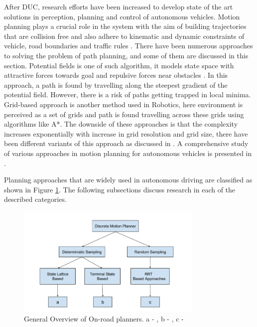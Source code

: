 After DUC, research efforts have been increased to develop state of the art solutions in perception, planning and control of autonomous vehicles. Motion planning plays a crucial role in the system with the aim of building trajectories that are collision free and also adhere to kinematic and dynamic constraints of vehicle, road boundaries and traffic rules \cite{motion_planning_techniques}. There have been numerous approaches to solving the problem of path planning, and some of them are discussed in this section. Potential fields is one of such algorithm, it models state space with attractive forces towards goal and repulsive forces near obstacles \cite{potential_field_3} \cite{potential_field_1} \cite{potential_field_2}. In this approach, a path is found by travelling along the steepest gradient of the potential field. However, there is a risk of paths getting trapped in local minima. Grid-based approach is another method used in Robotics, here environment is perceived as a set of grids and path is found travelling across these grids using algorithms like A*. The downside of these approaches is that the complexity increases exponentially with increase in grid resolution and grid size, there have been different variants of this approach as discussed in \cite{A_star} \cite{D_star_1} \cite{kolski_thesis}. A comprehensive study of various approaches in motion planning for autonomous vehicles is presented in \cite{motion_planning_techniques} \cite{survey_planning_techniques}.

 Planning approaches that are widely used in autonomous driving are classified as shown in Figure \ref{related_work_classification}. The following subsections discuss research in each of the described categories. 

\begin{figure}[H]
	\centering
	\includegraphics[width=0.8\textwidth]{Images/related_work/planning_division.png}
	\caption{General Overview of On-road planners. a - \cite{cmu_parallel_thesis}  \cite{diss_shui_phd_thesis} \cite{traj_planner_optimization} \cite{lattice_Gu_Tiyanu} \cite{unit_A_star} , b - \cite{kolski_thesis} \cite{real_time_traj_plan_article} \cite{darpa_urban_challenge}, c -\cite{rrt_star} \cite{rrt_urban_driv} \cite{mit_rrt1}
	}
	\label{related_work_classification}
\end{figure}

